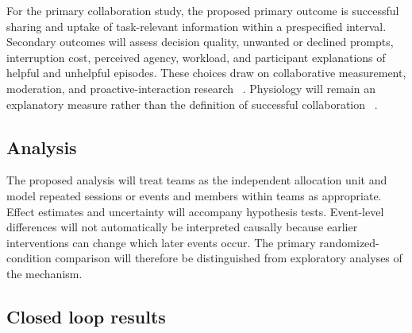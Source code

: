 For the primary collaboration study, the proposed primary outcome is successful sharing and uptake of task-relevant information within a prespecified interval. Secondary outcomes will assess decision quality, unwanted or declined prompts, interruption cost, perceived agency, workload, and participant explanations of helpful and unhelpful episodes. These choices draw on collaborative measurement, moderation, and proactive-interaction research ~\cite{p57,p70,expect}. Physiology will remain an explanatory measure rather than the definition of successful collaboration ~\cite{p32}.


\subsection{Analysis}

The proposed analysis will treat teams as the independent allocation unit and model repeated sessions or events and members within teams as appropriate. Effect estimates and uncertainty will accompany hypothesis tests. Event-level differences will not automatically be interpreted causally because earlier interventions can change which later events occur. The primary randomized-condition comparison will therefore be distinguished from exploratory analyses of the mechanism.


\subsection{Closed loop results}

